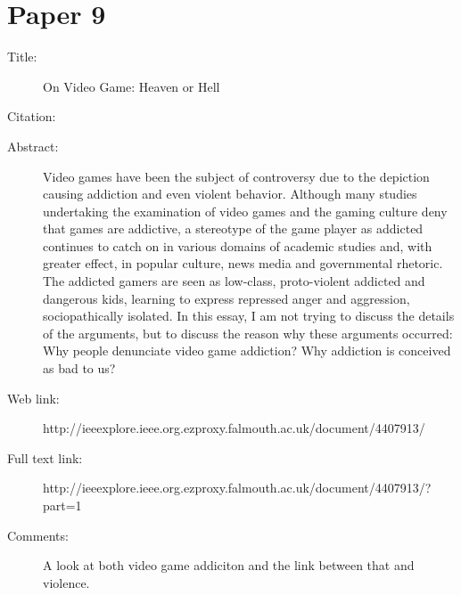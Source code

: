 \documentclass{scrartcl}
\begin{document}
\section*{Paper 9}
\begin{description}
\item[Title:] On Video Game: Heaven or Hell
\item[Citation:] \cite{heavenhell}
\item[Abstract:] Video games have been the subject of controversy due to the depiction causing addiction and even violent behavior. Although many studies undertaking the examination of video games and the gaming culture deny that games are addictive, a stereotype of the game player as addicted continues to catch on in various domains of academic studies and, with greater effect, in popular culture, news media and governmental rhetoric. The addicted gamers are seen as low-class, proto-violent addicted and dangerous kids, learning to express repressed anger and aggression, sociopathically isolated. In this essay, I am not trying to discuss the details of the arguments, but to discuss the reason why these arguments occurred: Why people denunciate video game addiction? Why addiction is conceived as bad to us?
\item[Web link:] http://ieeexplore.ieee.org.ezproxy.falmouth.ac.uk/document/4407913/
\item[Full text link:] http://ieeexplore.ieee.org.ezproxy.falmouth.ac.uk/document/4407913/?part=1
\item[Comments:]  A look at both video game addiciton and the link between that and violence. 
\end{description}
\end{document}
